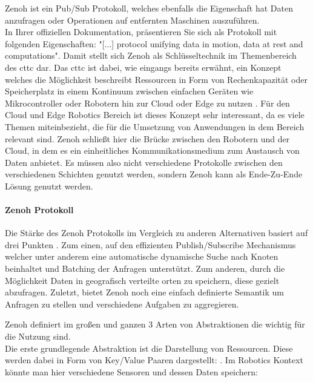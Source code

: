 Zenoh ist ein Pub/Sub Protokoll, welches ebenfalls die Eigenschaft hat Daten anzufragen oder Operationen auf entfernten Maschinen auszuführen.\\
In Ihrer offiziellen Dokumentation, präsentieren Sie sich als Protokoll mit folgenden Eigenschaften: "[...] protocol unifying data in motion, data at rest and computations"\cite{ZenohZeroOverhead2022}. Damit stellt sich Zenoh als Schlüsseltechnik im Themenbereich des \acrlong{cttc} dar. Das \acrlong{cttc} ist dabei, wie eingangs bereits erwähnt, ein Konzept welches die Möglichkeit beschreibt Ressourcen in Form von Rechenkapazität oder Speicherplatz in einem Kontinuum zwischen einfachen Geräten wie Mikrocontroller oder Robotern hin zur Cloud oder Edge zu nutzen \cite{baldoniZenohbasedDataflowFramework2021}. Für den Cloud und Edge Robotics Bereich ist dieses Konzept sehr interessant, da es viele Themen miteinbezieht, die für die Umsetzung von Anwendungen in dem Bereich relevant sind. Zenoh schließt hier die Brücke zwischen den Robotern und der Cloud, in dem es ein einheitliches Kommunikationsmedium zum Austausch von Daten anbietet. Es müssen also nicht verschiedene Protokolle zwischen den verschiedenen Schichten genutzt werden, sondern Zenoh kann als Ende-Zu-Ende Lösung genutzt werden.

\paragraph{Zenoh Protokoll} %
\label{par:Zenoh Protokoll}

Die Stärke des Zenoh Protokolls im Vergleich zu anderen Alternativen basiert auf drei Punkten \cite{baldoniZenohbasedDataflowFramework2021}. Zum einen, auf den effizienten Publish/Subscribe Mechanismus welcher unter anderem eine automatische dynamische Suche nach Knoten beinhaltet und Batching der Anfragen unterstützt. Zum anderen, durch die Möglichkeit Daten in geografisch verteilte orten zu speichern, diese gezielt abzufragen. Zuletzt, bietet Zenoh noch eine einfach definierte Semantik um Anfragen zu stellen und verschiedene Aufgaben zu aggregieren.

Zenoh definiert im großen und ganzen 3 Arten von Abstraktionen\cite{ZenohZeroOverhead2022} die wichtig für die Nutzung sind.\\
Die erste grundlegende Abstraktion ist die Darstellung von Ressourcen. Diese werden dabei in Form von Key/Value Paaren dargestellt: . Im Robotics Kontext könnte man hier verschiedene Sensoren und dessen Daten speichern:


